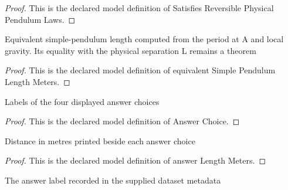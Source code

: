 \begin{proof}
  This is the declared model definition of Satisfies Reversible Physical Pendulum Laws.
\end{proof}
\begin{definition}
  \label{def:physics:phyx-mini-0282:phyxminiproblems-problemphyxmini0282-equivalentsimplependulumlengthmeters}
  Equivalent simple-pendulum length computed from the period at A and local gravity. Its equality with the physical separation L remains a theorem
\end{definition}
\begin{proof}
  This is the declared model definition of equivalent Simple Pendulum Length Meters.
\end{proof}
\begin{definition}
  \label{def:physics:phyx-mini-0282:phyxminiproblems-problemphyxmini0282-answerchoice}
  Labels of the four displayed answer choices
\end{definition}
\begin{proof}
  This is the declared model definition of Answer Choice.
\end{proof}
\begin{definition}
  \label{def:physics:phyx-mini-0282:phyxminiproblems-problemphyxmini0282-answerlengthmeters}
  Distance in metres printed beside each answer choice
\end{definition}
\begin{proof}
  This is the declared model definition of answer Length Meters.
\end{proof}
\begin{definition}
  \label{def:physics:phyx-mini-0282:phyxminiproblems-problemphyxmini0282-recordedanswerchoice}
  The answer label recorded in the supplied dataset metadata
\end{definition}
